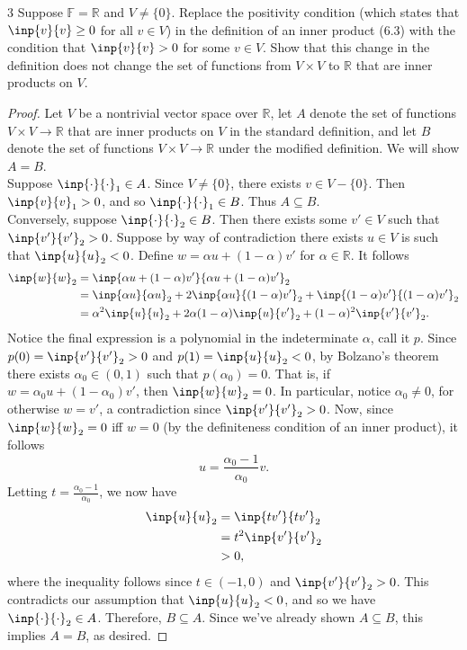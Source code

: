 \documentclass{extarticle}
\newenvironment{problem}[1]{\begin{prob*}{#1}{}}{\end{prob*}}
\newcommand{\R}{\mathbb{R}}
\newcommand{\F}{\mathbb{F}}
\begin{document}
\begin{problem}{3}
Suppose $\F=\R$ and $V\neq \{0\}$.  Replace the positivity condition (which states that $\inp{v}{v}\geq0$ for all $v\in V$) in the definition of an inner product (6.3) with the condition that $\inp{v}{v} > 0$ for some $v\in V$.  Show that this change in the definition does not change the set of functions from $V\times V$ to $\R$ that are inner products on $V$.
\end{problem}
\begin{proof}
Let $V$ be a nontrivial vector space over $\R$, let $A$ denote the set of functions $V\times V\to\R$ that are inner products on $V$ in the standard definition, and let $B$ denote the set of functions $V\times V\to \R$ under the modified definition.  We will show $A = B$.\\
\indent Suppose $\inp{\cdot}{\cdot}_1\in A$.  Since $V\neq\{0\}$, there exists $v\in V-\{0\}$.  Then $\inp{v}{v}_1>0$, and so $\inp{\cdot}{\cdot}_1\in B$.  Thus $A\subseteq B$.\\ 
\indent Conversely, suppose $\inp{\cdot}{\cdot}_2 \in B$.  Then there exists some $v'\in V$ such that $\inp{v'}{v'}_2 > 0$.  Suppose by way of contradiction there exists $u\in V$ is such that $\inp{u}{u}_2 < 0$.  Define $w = \alpha u + (1- \alpha) v'$ for $\alpha\in\R$.  It follows
\begin{align*}
\inp{w}{w}_2 &= \inp{\alpha u + (1- \alpha) v'}{\alpha u + (1- \alpha) v'}_2\\
&= \inp{\alpha u}{\alpha u}_2 + 2\inp{\alpha u}{(1 - \alpha)v'}_2 + \inp{(1 - \alpha)v'}{(1 - \alpha)v'}_2\\
&= \alpha^2\inp{u}{u}_2 + 2\alpha(1-\alpha)\inp{u}{v'}_2 + (1-\alpha)^2\inp{v'}{v'}_2.
\end{align*}
Notice the final expression is a polynomial in the indeterminate $\alpha$, call it $p$.  Since $p(0) = \inp{v'}{v'}_2 > 0$ and $p(1) = \inp{u}{u}_2 < 0$, by Bolzano's theorem there exists $\alpha_0\in(0, 1)$ such that $p(\alpha_0) = 0$.  That is, if $ w = \alpha_0u + (1 - \alpha_0)v'$, then $\inp{w}{w}_2 = 0$.  In particular, notice $\alpha_0\neq 0$, for otherwise $w = v'$, a contradiction since $\inp{v'}{v'}_2 > 0$.  Now, since $\inp{w}{w}_2 = 0$ iff $w = 0$ (by the definiteness condition of an inner product), it follows 
\begin{equation*}
u = \frac{\alpha_0 - 1}{\alpha_0} v.
\end{equation*}
Letting $t =  \frac{\alpha_0 - 1}{\alpha_0}$, we now have
\begin{align*}
\inp{u}{u}_2 &= \inp{tv'}{tv'}_2\\
&= t^2\inp{v'}{v'}_2\\
&> 0,
\end{align*}
where the inequality follows since $t\in(-1, 0)$ and $\inp{v'}{v'}_2 > 0$.  This contradicts our assumption that $\inp{u}{u}_2 < 0$, and so we have $\inp{\cdot}{\cdot}_2\in A$.  Therefore, $B\subseteq A$.  Since we've already shown $A\subseteq B$, this implies $A = B$, as desired.
\end{proof}
\end{document}
